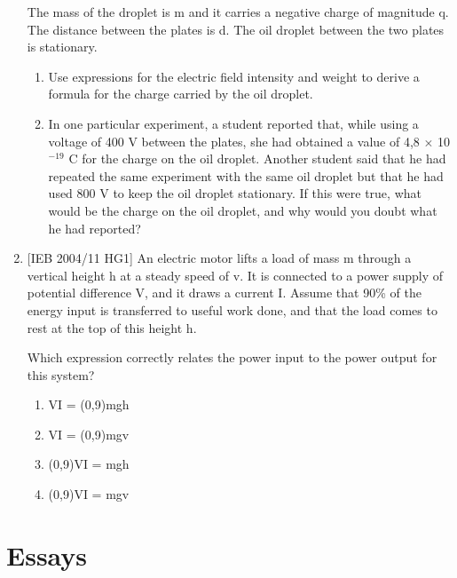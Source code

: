 \begin{enumerate}
{The mass of the droplet is m and it carries a negative charge of magnitude q. The distance between the plates is d. The oil droplet between the two plates is stationary.

\begin{enumerate}
\item{Use expressions for the electric field intensity and weight to derive a formula for the charge carried by the oil droplet.}
\item{In one particular experiment, a student reported that, while using a voltage of 400 V between the plates, she had obtained a value of 4,8 $\times$ 10$^{-19}$ C for the charge on the oil droplet. Another student said that he had repeated the same experiment with the same oil droplet but that he had used 800 V to keep the oil droplet stationary. If this were true, what would be the charge on the oil droplet, and why would you doubt what he had reported?}
\end{enumerate}}

\item{[IEB 2004/11 HG1] An electric motor lifts a load of mass m through a vertical height h at a steady speed of v. It is connected to a power supply of potential difference V, and it draws a current I. Assume that 90\% of the energy input is transferred to useful work done, and that the load comes to rest at the top of this height h.


Which expression correctly relates the power input to the power output for this system?

\begin{enumerate}
\item{VI = (0,9)mgh}
\item{VI = (0,9)mgv}
\item{(0,9)VI = mgh}
\item{(0,9)VI = mgv}
\end{enumerate}}
\end{enumerate}





\part{Essays}





